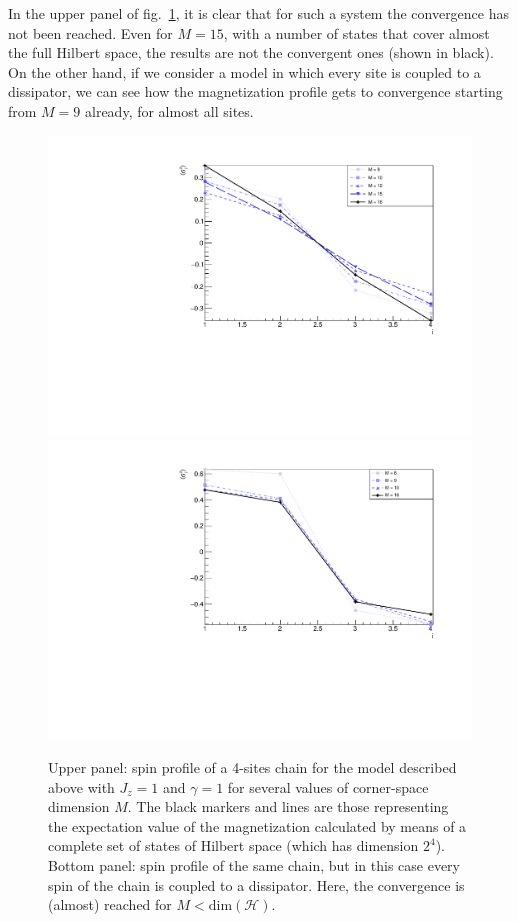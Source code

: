 In the upper panel of fig.~\ref{fig:4sites_LM_convergenceIncreasingM}, it is clear that for such a system the convergence has not been reached. Even for $M = 15$, with a number of states that cover almost the full Hilbert space, the results are not the convergent ones (shown in black). On the other hand, if we consider a model in which every site is coupled to a dissipator, we can see how the magnetization profile gets to convergence starting from $M = 9$ already, for almost all sites. 

\begin{figure}[H]
    \centering
    \includegraphics[scale=0.6]{Figures/4sites/4sites_LM_convergenceIncreasingM.pdf}
    \includegraphics[scale=0.6]{Figures/4sites/4sites_totalDissipators.pdf}
    \captionsetup{width=1.\linewidth}
    \caption{Upper panel: spin profile of a 4-sites chain for the model described above with $J_z=1$ and $\gamma = 1 $ for several values of corner-space dimension $M$. The black markers and lines are those representing the expectation value of the magnetization calculated by means of a complete set of states of Hilbert space (which has dimension $2^4$).
    Bottom panel: spin profile of the same chain, but in this case every spin of the chain is coupled to a dissipator. Here, the convergence is (almost) reached for $M<\text{dim}(\mathcal{H})$.}
    \label{fig:4sites_LM_convergenceIncreasingM}
\end{figure}

